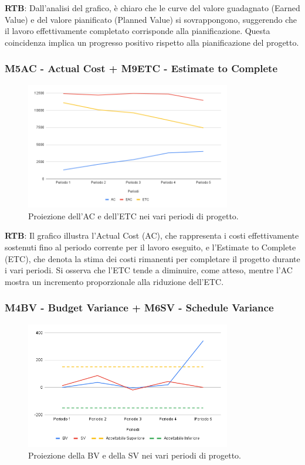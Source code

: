 \textbf{RTB}: Dall'analisi del grafico, è chiaro che le curve del valore guadagnato (Earned Value) e del valore pianificato (Planned Value) si sovrappongono, suggerendo che il lavoro effettivamente completato corrisponde alla pianificazione. Questa coincidenza implica un progresso positivo rispetto alla pianificazione del progetto.

\subsubsection{M5AC - Actual Cost + M9ETC - Estimate to Complete}
\begin{figure}[H]
    \centering
    \includegraphics[width=0.8\textwidth]{../Images/PianoDiQualifica/AC_ETC.png}
    \caption{Proiezione dell’AC e dell’ETC nei vari periodi di progetto.}
    \label{fig:3}
\end{figure}

\textbf{RTB}: Il grafico illustra l'Actual Cost (AC), che rappresenta i costi effettivamente sostenuti fino al periodo corrente per il lavoro eseguito, e l'Estimate to Complete (ETC), che denota la stima dei costi rimanenti per completare il progetto durante i vari periodi. Si osserva che l'ETC tende a diminuire, come atteso, mentre l'AC mostra un incremento proporzionale alla riduzione dell'ETC.

\subsubsection{M4BV - Budget Variance + M6SV - Schedule Variance}
\begin{figure}[H]
    \centering
    \includegraphics[width=0.8\textwidth]{../Images/PianoDiQualifica/BV_SV.png}
    \caption{Proiezione della BV e della SV nei vari periodi di progetto.}
    \label{fig:4}
\end{figure}


